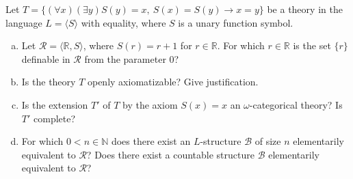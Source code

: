 \begin{problem}

    Let $T=\{(\forall x)(\exists y) S(y)=x,\ S(x)=S(y)\to x=y\}$ be a theory in the language $L=\langle S\rangle$ with equality, where $S$ is a unary function symbol.
    \begin{enumerate}[(a)]
        \item Let $\mathcal{R}=\langle\mathbb{R},S\rangle$, where $S(r)=r+1$ for $r\in\mathbb{R}$. For which $r\in\mathbb{R}$ is the set $\{r\}$ definable in $\mathcal{R}$ from the parameter $0$?
        \item Is the theory $T$ openly axiomatizable? Give justification.
        \item Is the extension $T'$ of $T$ by the axiom $S(x)=x$ an $\omega$-categorical theory? Is $T'$ complete?
        \item For which $0<n\in\mathbb{N}$ does there exist an $L$-structure $\mathcal{B}$ of size $n$ elementarily equivalent to $\mathcal{R}$? Does there exist a countable structure $\mathcal{B}$ elementarily equivalent to $\mathcal{R}$?
    \end{enumerate}

\end{problem}





